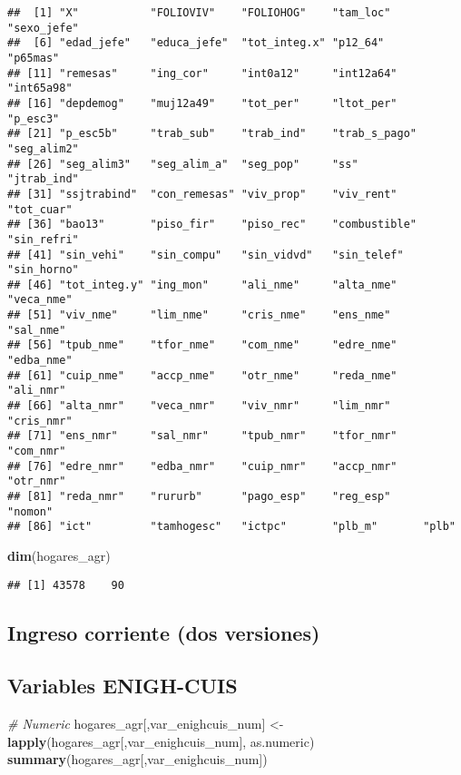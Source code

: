 \documentclass[11pt,]{article}
\newenvironment{Shaded}{\begin{snugshade}}{\end{snugshade}}
\newcommand{\KeywordTok}[1]{\textcolor[rgb]{0.13,0.29,0.53}{\textbf{#1}}}
\newcommand{\StringTok}[1]{\textcolor[rgb]{0.31,0.60,0.02}{#1}}
\newcommand{\CommentTok}[1]{\textcolor[rgb]{0.56,0.35,0.01}{\textit{#1}}}
\newcommand{\NormalTok}[1]{#1}
\begin{document}
\begin{verbatim}
##  [1] "X"           "FOLIOVIV"    "FOLIOHOG"    "tam_loc"     "sexo_jefe"  
##  [6] "edad_jefe"   "educa_jefe"  "tot_integ.x" "p12_64"      "p65mas"     
## [11] "remesas"     "ing_cor"     "int0a12"     "int12a64"    "int65a98"   
## [16] "depdemog"    "muj12a49"    "tot_per"     "ltot_per"    "p_esc3"     
## [21] "p_esc5b"     "trab_sub"    "trab_ind"    "trab_s_pago" "seg_alim2"  
## [26] "seg_alim3"   "seg_alim_a"  "seg_pop"     "ss"          "jtrab_ind"  
## [31] "ssjtrabind"  "con_remesas" "viv_prop"    "viv_rent"    "tot_cuar"   
## [36] "bao13"       "piso_fir"    "piso_rec"    "combustible" "sin_refri"  
## [41] "sin_vehi"    "sin_compu"   "sin_vidvd"   "sin_telef"   "sin_horno"  
## [46] "tot_integ.y" "ing_mon"     "ali_nme"     "alta_nme"    "veca_nme"   
## [51] "viv_nme"     "lim_nme"     "cris_nme"    "ens_nme"     "sal_nme"    
## [56] "tpub_nme"    "tfor_nme"    "com_nme"     "edre_nme"    "edba_nme"   
## [61] "cuip_nme"    "accp_nme"    "otr_nme"     "reda_nme"    "ali_nmr"    
## [66] "alta_nmr"    "veca_nmr"    "viv_nmr"     "lim_nmr"     "cris_nmr"   
## [71] "ens_nmr"     "sal_nmr"     "tpub_nmr"    "tfor_nmr"    "com_nmr"    
## [76] "edre_nmr"    "edba_nmr"    "cuip_nmr"    "accp_nmr"    "otr_nmr"    
## [81] "reda_nmr"    "rururb"      "pago_esp"    "reg_esp"     "nomon"      
## [86] "ict"         "tamhogesc"   "ictpc"       "plb_m"       "plb"
\end{verbatim}

\begin{Shaded}
\begin{Highlighting}[]
\KeywordTok{dim}\NormalTok{(hogares_agr)}
\end{Highlighting}
\end{Shaded}

\begin{verbatim}
## [1] 43578    90
\end{verbatim}

\subsection{Ingreso corriente (dos
versiones)}\label{ingreso-corriente-dos-versiones}

\subsection{Variables ENIGH-CUIS}\label{variables-enigh-cuis}

\begin{Shaded}
\begin{Highlighting}[]
\CommentTok{# Numeric}
\NormalTok{hogares_agr[,var_enighcuis_num] <-}\StringTok{ }\KeywordTok{lapply}\NormalTok{(hogares_agr[,var_enighcuis_num],}
\NormalTok{                                          as.numeric)}
\KeywordTok{summary}\NormalTok{(hogares_agr[,var_enighcuis_num])}
\end{Highlighting}
\end{Shaded}
\end{document}
